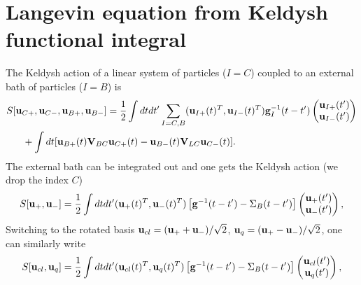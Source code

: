 
\section{Langevin equation from Keldysh functional integral} 

The Keldysh action of a linear system of particles ($I=C$) coupled to an external bath of particles ($I=B$) is
\begin{alignat}{2}
 S&[\mathbf{u}_{C+},\mathbf{u}_{C-},\mathbf{u}_{B+},\mathbf{u}_{B-}] =  \frac{1}{2} \int dtdt' \sum_{I=C,B} (\mathbf{u}_{I+}(t)^T,\mathbf{u}_{I-}(t)^T) 
 \mathbf{g}^{-1}_I(t-t')
 \left( 
 \begin{matrix}
  \mathbf{u}_{I+}(t') \\ \mathbf{u}_{I-}(t')
 \end{matrix}
 \right) \nonumber \\
  &\quad + \int dt [\mathbf{u}_{B+}(t) \mathbf{V}_{BC} \mathbf{u}_{C+}(t) -  \mathbf{u}_{B-}(t) \mathbf{V}_{LC} \mathbf{u}_{C-}(t)]. 
\end{alignat}
The external bath can be integrated out and one gets the Keldysh action (we drop the index $C$)
\begin{equation}
 S[\mathbf{u}_+,\mathbf{u}_-] = \frac{1}{2} \int dtdt' (\mathbf{u}_{+}(t)^T,\mathbf{u}_{-}(t)^T) 
 \left[\mathbf{g}^{-1}(t-t')-\Sigma_B(t-t') \right]
 \left(\begin{matrix}
  \mathbf{u}_{+}(t') \\ \mathbf{u}_{-}(t')
 \end{matrix}
 \right) ,
\end{equation}
Switching to the rotated basis $\mathbf{u}_{cl}=(\mathbf{u}_++\mathbf{u}_-)/\sqrt{2}$, $\mathbf{u}_{q}=(\mathbf{u}_+-\mathbf{u}_-)/\sqrt{2}$, one can similarly write
\begin{equation}
 S[\mathbf{u}_{cl},\mathbf{u}_{q}] = \frac{1}{2} \int dtdt' (\mathbf{u}_{cl}(t)^T,\mathbf{u}_{q}(t)^T) 
 \left[\mathbf{g}^{-1}(t-t')-\Sigma_B(t-t') \right]
 \left(\begin{matrix}
  \mathbf{u}_{cl}(t') \\ \mathbf{u}_{q}(t')
 \end{matrix}
 \right) ,
\end{equation}
